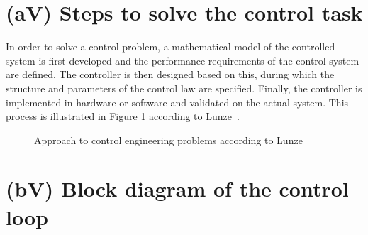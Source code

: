 \documentclass[12pt, oneside, a4paper]{scrreprt}
\begin{document}
        \section{(aV) Steps to solve the control task}
            In order to solve a control problem, a mathematical model of the controlled system is first developed and the performance requirements of the control system are defined. The controller is then designed based on this, during which the structure and parameters of the control law are specified. Finally, the controller is implemented in hardware or software and validated on the actual system. This process is illustrated in Figure \ref{fig:loesungsweg_lunze} according to Lunze~\cite{Lunze2016}.

            \begin{figure}[H]
                \centering
                \caption{Approach to control engineering problems according to Lunze~\cite{Lunze2016}}
                \label{fig:loesungsweg_lunze}
            \end{figure}

            \cleardoubleemptypage

        \section{(bV) Block diagram of the control loop}
            
\end{document}
